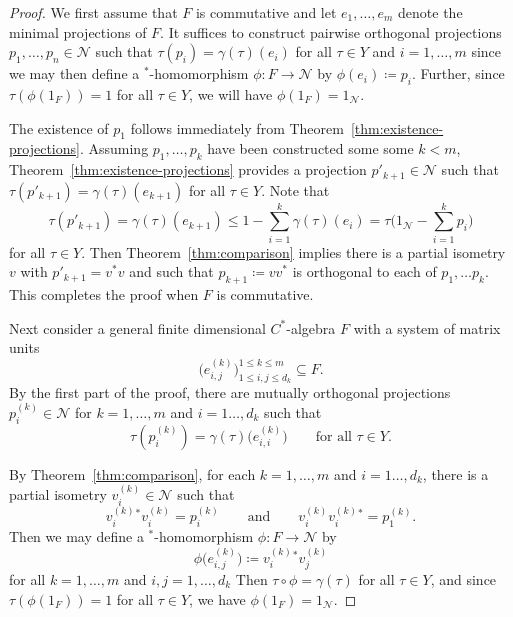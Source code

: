 \documentclass[a4paper,11pt]{amsart}
\theoremstyle{definition}
\numberwithin{equation}{section}
\numberwithin{theorem}{section}
\begin{document}
\begin{proof}
	We first assume that $F$ is commutative and let $e_1, \ldots, e_m$ denote the minimal projections of $F$.  It suffices to construct pairwise orthogonal projections $p_1, \ldots, p_n \in \mathcal N$ such that $\tau(p_i) = \gamma(\tau)(e_i)$ for all $\tau \in Y$ and $i = 1, \ldots, m$ since we may then define a $^*$-homomorphism $\phi \colon F \rightarrow \mathcal N$ by $\phi(e_i) \coloneqq p_i$.  Further, since $\tau(\phi(1_F)) = 1$ for all $\tau \in Y$, we will have $\phi(1_F) = 1_\mathcal N$.
	
	The existence of $p_1$ follows immediately from Theorem~\ref{thm:existence-projections}.  Assuming $p_1, \ldots, p_k$ have been constructed some some $k < m$, Theorem~\ref{thm:existence-projections} provides a projection $p'_{k+1} \in \mathcal N$ such that $\tau(p'_{k+1}) = \gamma(\tau)(e_{k+1})$ for all $\tau \in Y$.  Note that
	\begin{equation}
		\tau(p'_{k+1}) = \gamma(\tau)(e_{k+1}) \leq 1 - \sum_{i=1}^k \gamma(\tau)(e_i) = \tau\Big(1_\mathcal N - \sum_{i=1}^k p_i \Big)
	\end{equation}
	for all $\tau \in Y$.  Then Theorem~\ref{thm:comparison} implies there is a partial isometry $v$ with $p'_{k+1} = v^*v$ and such that $p_{k+1} \coloneqq vv^*$ is orthogonal to each of $p_1, \ldots p_k$.  This completes the proof when $F$ is commutative.
	
	
	Next consider a general finite dimensional $C^*$-algebra $F$ with a system of matrix units 
	\begin{equation}
		\big(e_{i, j}^{(k)}\big)_{1 \leq i, j \leq d_k}^{1 \leq k \leq m} \subseteq F.
	\end{equation}
	By the first part of the proof, there are mutually orthogonal projections $p_{i}^{(k)} \in \mathcal N$ for $k = 1, \ldots, m$ and $i = 1\ldots, d_k$ such that
	\begin{equation}
		\tau(p_{i}^{(k)}) = \gamma(\tau)\big(e_{i,i}^{(k)}\big) \qquad \text{for all } \tau \in Y.
	\end{equation}
	
	By Theorem~\ref{thm:comparison}, for each $k = 1, \ldots, m$ and $i = 1\ldots, d_k$, there is a partial isometry $v_{i}^{(k)} \in \mathcal N$ such that 
	\begin{equation}
		v_{i}^{(k)}{}^* v_{i}^{(k)} = p_{i}^{(k)} \qquad \text{and} \qquad v_{i}^{(k)} v_{i}^{(k)}{}^* = p_{1}^{(k)}.
	\end{equation}
	Then we may define a $^*$-homomorphism $\phi \colon F \rightarrow \mathcal N$ by
	\begin{equation}
		\phi\big(e_{i, j}^{(k)}\big) \coloneqq v_{i}^{(k)}{}^*v_{j}^{(k)}
	\end{equation}
	for all $k = 1, \ldots, m$ and $i, j = 1, \ldots, d_k$  Then $\tau \circ \phi = \gamma(\tau)$ for all $\tau \in Y$, and since $\tau(\phi(1_F)) = 1$ for all $\tau \in Y$, we have $\phi(1_F) = 1_\mathcal N$.
\end{proof}
\end{document}
